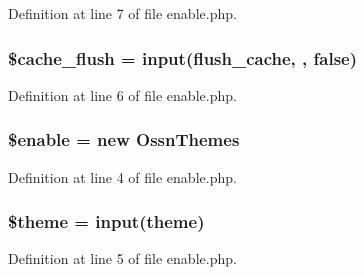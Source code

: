 Definition at line 7 of file enable.\+php.

\subsubsection[{\texorpdfstring{\$cache\+\_\+flush}{$cache_flush}}]{\setlength{\rightskip}{0pt plus 5cm}\$cache\+\_\+flush = {\bf input}(\textquotesingle{}flush\+\_\+cache\textquotesingle{}, \textquotesingle{}\textquotesingle{}, false)}\hypertarget{theme_2enable_8php_a151b5f3a9fe388b3ab2ae8d39857e089}{}\label{theme_2enable_8php_a151b5f3a9fe388b3ab2ae8d39857e089}


Definition at line 6 of file enable.\+php.

\subsubsection[{\texorpdfstring{\$enable}{$enable}}]{\setlength{\rightskip}{0pt plus 5cm}\$enable = new {\bf Ossn\+Themes}}\hypertarget{theme_2enable_8php_abea865f3ca62b18578d7a0ca285d216e}{}\label{theme_2enable_8php_abea865f3ca62b18578d7a0ca285d216e}


Definition at line 4 of file enable.\+php.

\subsubsection[{\texorpdfstring{\$theme}{$theme}}]{\setlength{\rightskip}{0pt plus 5cm}\$theme = {\bf input}(\textquotesingle{}theme\textquotesingle{})}\hypertarget{theme_2enable_8php_a1ae541f7fe1c5e21cb4535f88ec9e9dc}{}\label{theme_2enable_8php_a1ae541f7fe1c5e21cb4535f88ec9e9dc}


Definition at line 5 of file enable.\+php.

